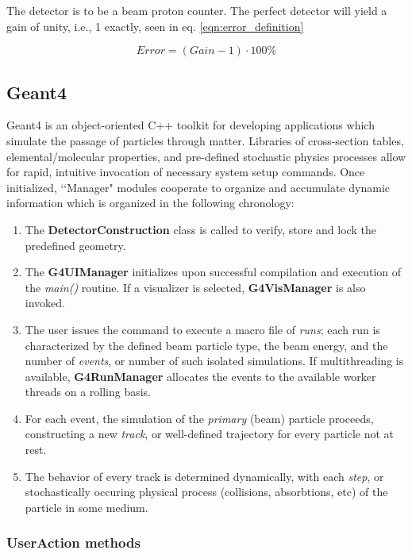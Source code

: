 \documentclass{mc2015}
\begin{document}
The detector is to be a beam proton counter. The perfect detector will yield a gain of unity, i.e., 1 exactly, seen in eq. \ref{eqn:error_definition}

\begin{equation}
Error = (Gain-1)\cdot100\%
\label{eqn:error_definition}
\end{equation}

\subsection{Geant4}

Geant4 is an object-oriented C++ toolkit for developing applications which simulate the passage of particles through matter. Libraries of cross-section tables, elemental/molecular properties, and pre-defined stochastic physics processes allow for rapid, intuitive invocation of necessary system setup commands. Once initialized, \lq\lq Manager" modules cooperate to organize and accumulate dynamic information which is organized in the following chronology:

\begin{enumerate}
\item The \textbf{DetectorConstruction} class is called to verify, store and lock the predefined geometry.
\item The \textbf{G4UIManager} initializes upon successful compilation and execution of the \emph{main()} routine.  If a visualizer is selected, \textbf{G4VisManager} is also invoked.
\item The user issues the command to execute a macro file of \emph{runs}; each run is characterized by the defined beam particle type, the beam energy, and the number of \emph{events}, or number of such isolated simulations.  If multithreading is available, \textbf{G4RunManager} allocates the events to the available worker threads on a rolling basis.
\item For each event, the simulation of the \emph{primary} (beam) particle proceeds, constructing a new \emph{track}, or well-defined trajectory for every particle not at rest.
\item The behavior of every track is determined dynamically, with each \emph{step}, or stochastically occuring physical process (collisions, absorbtions, etc) of the particle in some medium.
\end{enumerate}

\subsubsection{UserAction methods}
\end{document}
